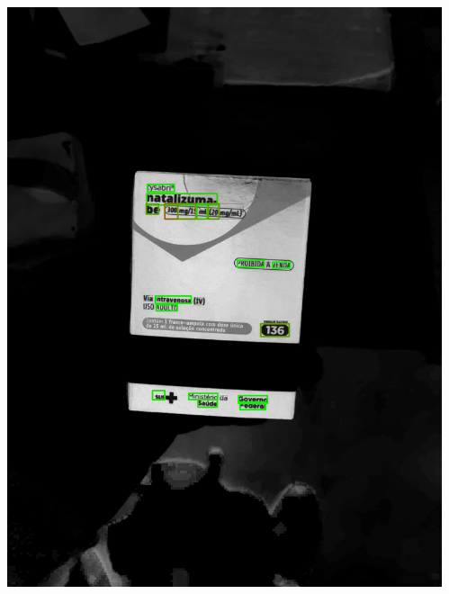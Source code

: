 \begin{frame}
\begin{columns}
\begin{column}{0.24\textwidth}
			\includegraphics[height=0.35\textheight]{../pictures/tysabri_cmyk_c_only_boxes.jpg}
		\end{column}
		\begin{column}{0.24\textwidth}\centering

\end{column}
\end{columns}
\end{frame}
